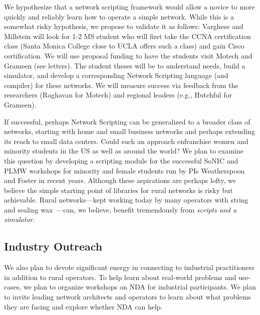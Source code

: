 We hypothesize that a network scripting framework would allow a novice to more quickly and reliably learn how to operate a simple network. While this is a somewhat risky hypothesis, we propose to validate it as follows: Varghese and Millstein will look for 1-2 MS student who will first take the CCNA certification class (Santa Monica College close to UCLA offers such a class) and gain Cisco certification.  We will use proposal funding to have the students visit Motech and Grameen (see letters).  The student theses will be to understand needs, build a simulator, and develop a corresponding Network Scripting language (and compiler) for these networks.  We will measure success via feedback from the researchers (Raghavan for Motech) and regional leaders (e.g., Hutchful for Grameen).

If successful, perhaps Network Scripting can be generalized to a broader class of networks, starting with home and small business networks and perhaps extending its reach to small data centers.  Could such an approach enfranchise women and minority students in the US as well as around the world?  We plan to examine this question by developing a scripting module for the successful SoNIC and PLMW workshops for minority and female students run by PIs Weatherspoon and Foster in recent years. Although these aspirations are perhaps lofty, we believe the simple starting point of libraries for rural networks is risky but achievable.  Rural networks---kept working today by many operators with string and sealing wax~\cite{barathwisp}---can, we believe, benefit tremendously from {\em scripts and a simulator}.  


\subsection*{Industry Outreach}

We also plan to devote significant energy in connecting to industrial
practitioners in addition to rural operators. To help learn about real-world problems and use-cases,
we plan to organize workshops on NDA for industrial participants. We
plan to invite leading network architects and operators to learn about
what problems they are facing and explore whether NDA can help. 
